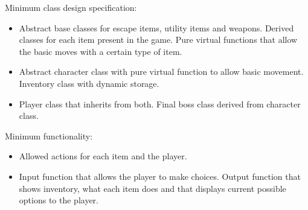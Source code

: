 \documentclass[11pt, a4paper]{awesome-cv}
\begin{document}
\begin{cvletter}
Minimum class design specification:
\begin{itemize}
\item Abstract base classes for escape items, utility items and weapons. Derived classes for each item present in the game. Pure virtual functions that allow the basic moves with a certain type of item.
\item Abstract character class with pure virtual function to allow basic movement. Inventory class with dynamic storage.
\item Player class that inherits from both. Final boss class derived from character class.
\end{itemize}

Minimum functionality:
\begin{itemize}
\item Allowed actions for each item and the player.
\item Input function that allows the player to make choices. Output function that shows inventory, what each item does and that displays current possible options to the player.
\end{itemize}


\end{cvletter}


\end{document}
